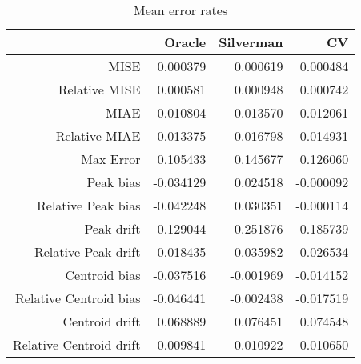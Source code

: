 \begin{table}[ht]
\centering
\begin{tabular}{rrrr}
  \hline
 & Oracle & Silverman & CV \\ 
  \hline
MISE & 0.000379 & 0.000619 & 0.000484 \\ 
  Relative MISE & 0.000581 & 0.000948 & 0.000742 \\ 
  MIAE & 0.010804 & 0.013570 & 0.012061 \\ 
  Relative MIAE & 0.013375 & 0.016798 & 0.014931 \\ 
  Max Error & 0.105433 & 0.145677 & 0.126060 \\ 
  Peak bias & -0.034129 & 0.024518 & -0.000092 \\ 
  Relative Peak bias & -0.042248 & 0.030351 & -0.000114 \\ 
  Peak drift & 0.129044 & 0.251876 & 0.185739 \\ 
  Relative Peak drift & 0.018435 & 0.035982 & 0.026534 \\ 
  Centroid bias & -0.037516 & -0.001969 & -0.014152 \\ 
  Relative Centroid bias & -0.046441 & -0.002438 & -0.017519 \\ 
  Centroid drift & 0.068889 & 0.076451 & 0.074548 \\ 
  Relative Centroid drift & 0.009841 & 0.010922 & 0.010650 \\ 
   \hline
\end{tabular}
\caption{Mean error rates} 
\label{tbl:mean_error_rates}
\end{table}
